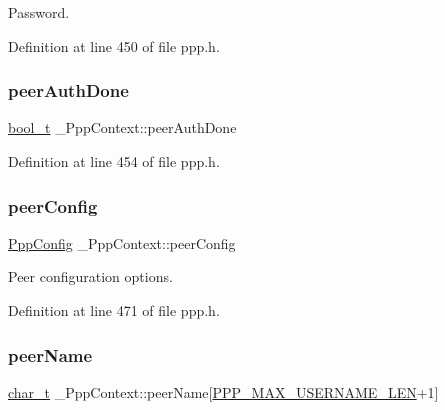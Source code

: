 Password. 



Definition at line 450 of file ppp.\+h.

\mbox{\label{struct__PppContext_a2f0a71c62240641fe3744ff7d31759cd}} 
\subsubsection{\texorpdfstring{peer\+Auth\+Done}{peerAuthDone}}
{\footnotesize\ttfamily \hyperlink{compiler__port_8h_a812d16e5494522586b3784e55d479912}{bool\+\_\+t} \+\_\+\+Ppp\+Context\+::peer\+Auth\+Done}



Definition at line 454 of file ppp.\+h.

\mbox{\label{struct__PppContext_a7441234f820bc1a2ab86d541ceddd84c}} 
\subsubsection{\texorpdfstring{peer\+Config}{peerConfig}}
{\footnotesize\ttfamily \hyperlink{structPppConfig}{Ppp\+Config} \+\_\+\+Ppp\+Context\+::peer\+Config}



Peer configuration options. 



Definition at line 471 of file ppp.\+h.

\mbox{\label{struct__PppContext_a103c7ad1970a95197be621b1ad411588}} 
\subsubsection{\texorpdfstring{peer\+Name}{peerName}}
{\footnotesize\ttfamily \hyperlink{compiler__port_8h_a40bb5262bf908c328fbcfbe5d29d0201}{char\+\_\+t} \+\_\+\+Ppp\+Context\+::peer\+Name\mbox{[}\hyperlink{ppp_8h_acafaf0139acdee8a293aa63cd32666b6}{P\+P\+P\+\_\+\+M\+A\+X\+\_\+\+U\+S\+E\+R\+N\+A\+M\+E\+\_\+\+L\+EN}+1\mbox{]}}



